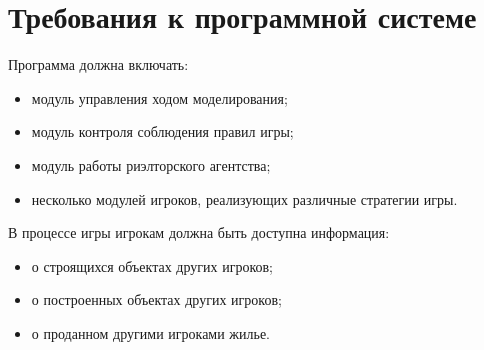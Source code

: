 \documentclass[a4paper,12pt]{article}
\begin{document}
\section{Требования к программной системе}

Программа должна включать:
\begin{itemize}
    \item модуль управления ходом моделирования;
    \item модуль контроля соблюдения правил игры;
    \item модуль работы риэлторского агентства;
    \item несколько модулей игроков, реализующих различные стратегии игры.
\end{itemize}

В процессе игры игрокам должна быть доступна информация:
\begin{itemize}
    \item о строящихся объектах других игроков;
    \item о построенных объектах других игроков;
    \item о проданном другими игроками жилье.
\end{itemize}
\end{document}
